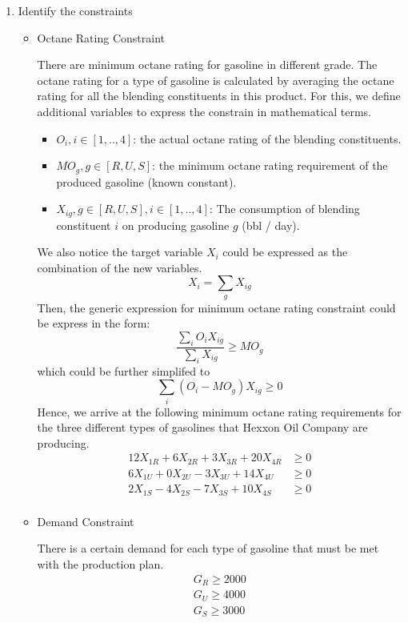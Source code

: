 \documentclass[11pt]{article}
\begin{document}
\begin{enumerate}
\begin{enumerate}
    \item Identify the constraints \par
    \begin{itemize}
        \item Octane Rating Constraint \par
        There are minimum octane rating for gasoline in different grade. The octane rating for a type of gasoline is calculated by averaging the octane rating for all the blending constituents in this product. For this, we define additional variables to express the constrain in mathematical terms.
        \begin{itemize}
            \item $O_i, i \in [1,..,4]$: the actual octane rating of the blending constituents.
            \item $\mathit{MO_g}, g \in [R, U, S]$: the minimum octane rating requirement of the produced gasoline (known constant).
            \item $X_{ig}, g \in [R, U, S], i \in [1,..,4]$: The consumption of blending constituent $i$ on producing gasoline $g$ (bbl / day). 
        \end{itemize}
        We also notice the target variable $X_i$ could be expressed as the combination of the new variables.
        $$X_i = \sum_g X_{ig}$$
        Then, the generic expression for minimum octane rating constraint could be express in the form:
        $$\frac{\sum_i O_iX_{ig}}{\sum_i X_{ig}} \geq \mathit{MO_g}$$
        which could be further simplifed to
        $$\sum_i (O_i - MO_g) X_{ig} \geq 0$$
        Hence, we arrive at the following minimum octane rating requirements for the three different types of gasolines that Hexxon Oil Company are producing.
        \begin{align*}
            12X_{1R} + 6X_{2R} + 3X_{3R} + 20X_{4R} &\geq 0 \\
            6X_{1U} + 0X_{2U} - 3X_{3U} + 14X_{4U} &\geq 0 \\
            2X_{1S} - 4X_{2S} - 7X_{3S} + 10X_{4S} &\geq 0 \\
        \end{align*}
        \item Demand Constraint \par
        There is a certain demand for each type of gasoline that must be met with the production plan.
        \begin{align*}
            G_R \geq 2000 \\
            G_U \geq 4000 \\
            G_S \geq 3000
        \end{align*}
        

\end{itemize}
\end{enumerate}
\end{enumerate}
\end{document}
